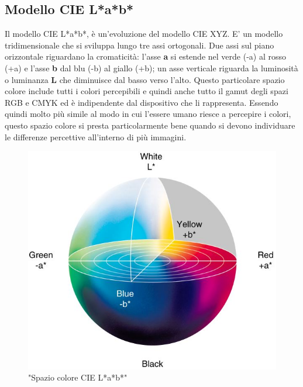 \documentclass[a4paper,11pt]{article}
\begin{document}
    
        \newpage

        \subsection{Modello CIE L*a*b*}
        Il modello CIE L*a*b*, è un'evoluzione del modello CIE XYZ. E' un modello tridimensionale che si sviluppa lungo tre assi ortogonali. Due assi sul piano orizzontale riguardano la cromaticità: l'asse \textbf{a} si estende nel verde (-a) al rosso (+a)
        e l'asse \textbf{b} dal blu (-b) al giallo (+b); un asse verticale riguarda la luminosità o luminanza \textbf{L} che diminuisce dal basso verso l'alto.
        Questo particolare spazio colore include tutti i colori percepibili e quindi anche tutto il gamut degli spazi RGB e CMYK ed è indipendente dal dispositivo che li rappresenta.
        Essendo quindi molto più simile al modo in cui l'essere umano riesce a percepire i colori, questo spazio colore si presta particolarmente bene quando si devono individuare le differenze percettive all'interno di più immagini.

    
        \begin{figure}[h]
            \centering
            \includegraphics[scale=0.6]{CIELAB.jpg}
            \caption{"Spazio colore CIE L*a*b*"}
        \end{figure}

    \newpage
\end{document}
